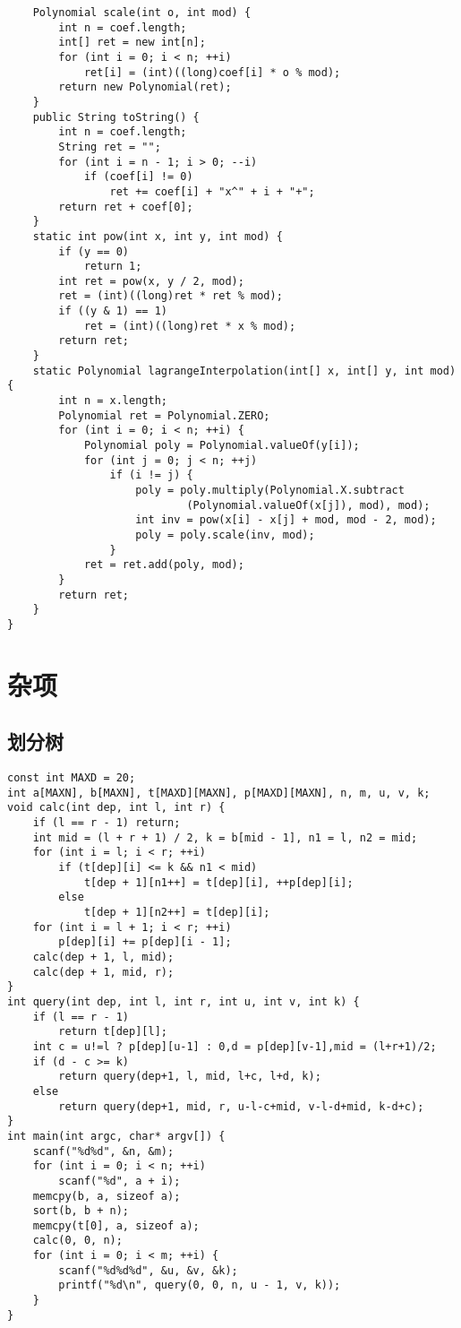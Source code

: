 \documentclass{article}
\begin{document}
\begin{lstlisting}
    Polynomial scale(int o, int mod) {
        int n = coef.length;
        int[] ret = new int[n];
        for (int i = 0; i < n; ++i)
            ret[i] = (int)((long)coef[i] * o % mod);
        return new Polynomial(ret);
    }
    public String toString() {
        int n = coef.length;
        String ret = "";
        for (int i = n - 1; i > 0; --i)
            if (coef[i] != 0)
                ret += coef[i] + "x^" + i + "+";
        return ret + coef[0];
    }
    static int pow(int x, int y, int mod) {
        if (y == 0)
            return 1;
        int ret = pow(x, y / 2, mod);
        ret = (int)((long)ret * ret % mod);
        if ((y & 1) == 1)
            ret = (int)((long)ret * x % mod);
        return ret;
    }
    static Polynomial lagrangeInterpolation(int[] x, int[] y, int mod) {
        int n = x.length;
        Polynomial ret = Polynomial.ZERO;
        for (int i = 0; i < n; ++i) {
            Polynomial poly = Polynomial.valueOf(y[i]);
            for (int j = 0; j < n; ++j)
                if (i != j) {
                    poly = poly.multiply(Polynomial.X.subtract
                            (Polynomial.valueOf(x[j]), mod), mod);
                    int inv = pow(x[i] - x[j] + mod, mod - 2, mod);
                    poly = poly.scale(inv, mod);
                }
            ret = ret.add(poly, mod);
        }
        return ret;
    }
}
\end{lstlisting}

\section{杂项}

\subsection{划分树}

\begin{lstlisting}
const int MAXD = 20;
int a[MAXN], b[MAXN], t[MAXD][MAXN], p[MAXD][MAXN], n, m, u, v, k;
void calc(int dep, int l, int r) {
    if (l == r - 1) return;
    int mid = (l + r + 1) / 2, k = b[mid - 1], n1 = l, n2 = mid;
    for (int i = l; i < r; ++i)
        if (t[dep][i] <= k && n1 < mid)
            t[dep + 1][n1++] = t[dep][i], ++p[dep][i];
        else
            t[dep + 1][n2++] = t[dep][i];
    for (int i = l + 1; i < r; ++i)
        p[dep][i] += p[dep][i - 1];
    calc(dep + 1, l, mid);
    calc(dep + 1, mid, r);
}
int query(int dep, int l, int r, int u, int v, int k) {
    if (l == r - 1)
        return t[dep][l];
    int c = u!=l ? p[dep][u-1] : 0,d = p[dep][v-1],mid = (l+r+1)/2;
    if (d - c >= k)
        return query(dep+1, l, mid, l+c, l+d, k);
    else
        return query(dep+1, mid, r, u-l-c+mid, v-l-d+mid, k-d+c);
}
int main(int argc, char* argv[]) {
    scanf("%d%d", &n, &m);
    for (int i = 0; i < n; ++i)
        scanf("%d", a + i);
    memcpy(b, a, sizeof a);
    sort(b, b + n);
    memcpy(t[0], a, sizeof a);
    calc(0, 0, n);
    for (int i = 0; i < m; ++i) {
        scanf("%d%d%d", &u, &v, &k);
        printf("%d\n", query(0, 0, n, u - 1, v, k));
    }
}
\end{lstlisting}
\end{document}
